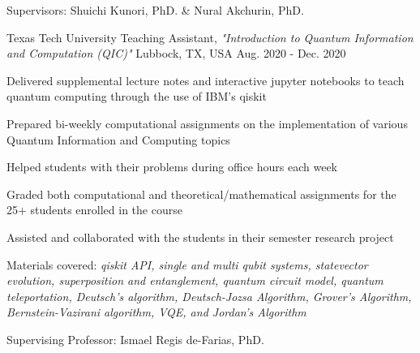 \begin{cventries}
{\begin{cvitems}
        \item{Supervisors: Shuichi Kunori, PhD. \& Nural Akchurin, PhD.}
        \end{cvitems}
        \vspace{1em}
    }

    \cventry
    {Texas Tech University}
    {Teaching Assistant, \textit{"Introduction to Quantum Information and Computation (QIC)"}}
    {Lubbock, TX, USA}
    {Aug. 2020 - Dec. 2020}
    {
        \begin{cvitems}
        \item{Delivered supplemental lecture notes and interactive jupyter notebooks to teach quantum computing through the use of IBM's qiskit}
        \item{Prepared bi-weekly computational assignments on the implementation of various Quantum Information and Computing topics}
        \item{Helped students with their problems during office hours each week}
        \item{Graded both computational and theoretical/mathematical assignments for the 25+ students enrolled in the course}
        \item{Assisted and collaborated with the students in their semester research project}
        \item{Materials covered: \textit{qiskit API, single and multi qubit systems, statevector evolution, superposition and entanglement, quantum circuit model, quantum teleportation, Deutsch's algorithm, Deutsch-Jozsa Algorithm, Grover's Algorithm, Bernstein-Vazirani algorithm, VQE, and Jordan's Algorithm}}
        \item{Supervising Professor: Ismael Regis de-Farias, PhD.}
        \end{cvitems}
        \vspace{1em}
    }


\end{cventries}
